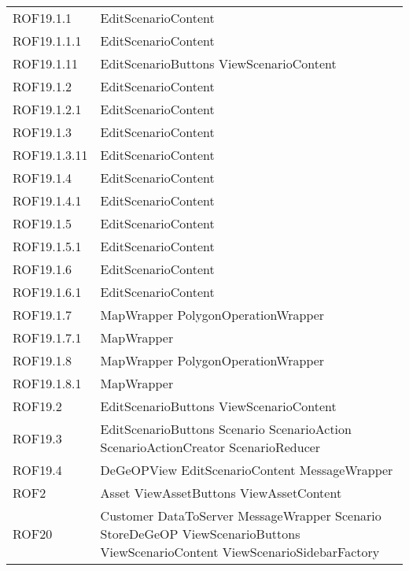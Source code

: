 \begin{longtable}{p{2.5cm}!{\VRule[1pt]}p{5cm}}
		ROF19.1.1 & EditScenarioContent\\
		ROF19.1.1.1 & EditScenarioContent\\
		ROF19.1.11 & EditScenarioButtons \newline ViewScenarioContent\\
		ROF19.1.2 & EditScenarioContent\\
		ROF19.1.2.1 & EditScenarioContent\\
		ROF19.1.3 & EditScenarioContent\\
		ROF19.1.3.11 & EditScenarioContent\\
		ROF19.1.4 & EditScenarioContent\\
		ROF19.1.4.1 & EditScenarioContent\\
		ROF19.1.5 & EditScenarioContent\\
		ROF19.1.5.1 & EditScenarioContent\\
		ROF19.1.6 & EditScenarioContent\\
		ROF19.1.6.1 & EditScenarioContent\\
		ROF19.1.7 & MapWrapper \newline PolygonOperationWrapper\\
		ROF19.1.7.1 & MapWrapper\\
		ROF19.1.8 & MapWrapper \newline PolygonOperationWrapper\\
		ROF19.1.8.1 & MapWrapper\\
		ROF19.2 & EditScenarioButtons \newline ViewScenarioContent\\
		ROF19.3 & EditScenarioButtons \newline Scenario \newline ScenarioAction \newline ScenarioActionCreator \newline ScenarioReducer\\
		ROF19.4 & DeGeOPView \newline EditScenarioContent \newline MessageWrapper\\
		ROF2 & Asset \newline ViewAssetButtons \newline ViewAssetContent\\
		ROF20 & Customer \newline DataToServer \newline MessageWrapper \newline Scenario \newline StoreDeGeOP \newline ViewScenarioButtons \newline ViewScenarioContent \newline ViewScenarioSidebarFactory\\

\end{longtable}
